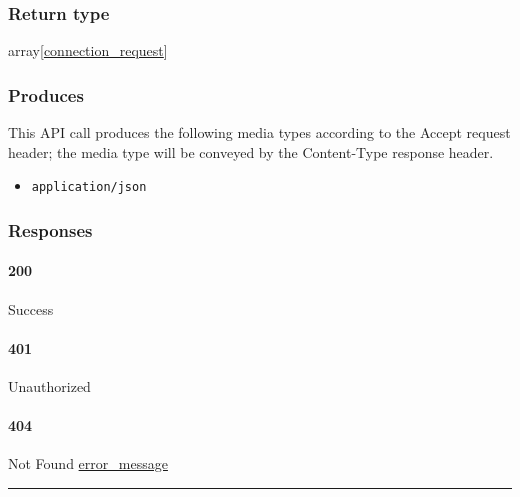 \hypertarget{return-type-122}{%
\subsubsection{Return type}\label{return-type-122}}

array{[}\protect\hyperlink{connection_request}{connection\_request}{]}

\hypertarget{produces-156}{%
\subsubsection{Produces}\label{produces-156}}

This API call produces the following media types according to the
{Accept} request header; the media type will be conveyed by the
{Content-Type} response header.

\begin{itemize}
\tightlist
\item
  \texttt{application/json}
\end{itemize}

\hypertarget{responses-161}{%
\subsubsection{Responses}\label{responses-161}}

\hypertarget{section-518}{%
\paragraph{200}\label{section-518}}

Success

\hypertarget{section-519}{%
\paragraph{401}\label{section-519}}

Unauthorized \protect\hyperlink{}{}

\hypertarget{section-520}{%
\paragraph{404}\label{section-520}}

Not Found \protect\hyperlink{error_message}{error\_message}

\begin{center}\rule{0.5\linewidth}{\linethickness}\end{center}

\protect\hypertarget{apiConnectionrequestPost}{}{}

